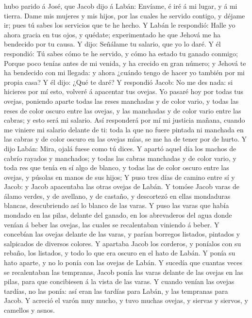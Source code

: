 hubo parido á José, que Jacob dijo á Labán: Envíame, é iré á mi lugar, y
á mi tierra.  Dame mis mujeres y mis hijos, por las
cuales he servido contigo, y déjame ir; pues tú sabes los servicios que
te he hecho.  Y Labán le respondió: Halle yo ahora gracia
en tus ojos, y quédate; experimentado he que Jehová me ha bendecido por
tu causa.  Y dijo: Señálame tu salario, que yo lo daré.
 Y él respondió: Tú sabes cómo te he servido, y cómo ha
estado tu ganado conmigo;  Porque poco tenías antes de mi
venida, y ha crecido en gran número; y Jehová te ha bendecido con mi
llegada: y ahora ¿cuándo tengo de hacer yo también por mi propia casa?
 Y él dijo: ¿Qué te daré? Y respondió Jacob: No me des
nada: si hicieres por mí esto, volveré á apacentar tus ovejas.
 Yo pasaré hoy por todas tus ovejas, poniendo aparte
todas las reses manchadas y de color vario, y todas las reses de color
oscuro entre las ovejas, y las manchadas y de color vario entre las
cabras; y esto será mi salario.  Así responderá por mí mi
justicia mañana, cuando me viniere mi salario delante de ti: toda la que
no fuere pintada ni manchada en las cabras y de color oscuro en las
ovejas mías, se me ha de tener por de hurto.  Y dijo
Labán: Mira, ojalá fuese como tú dices.  Y apartó aquel
día los machos de cabrío rayados y manchados; y todas las cabras
manchadas y de color vario, y toda res que tenía en sí algo de blanco, y
todas las de color oscuro entre las ovejas, y púsolas en manos de sus
hijos;  Y puso tres días de camino entre sí y Jacob: y
Jacob apacentaba las otras ovejas de Labán.  Y tomóse
Jacob varas de álamo verdes, y de avellano, y de castaño, y descortezó
en ellas mondaduras blancas, descubriendo así lo blanco de las varas.
 Y puso las varas que había mondado en las pilas, delante
del ganado, en los abrevaderos del agua donde venían á beber las ovejas,
las cuales se recalentaban viniendo á beber.  Y concebían
las ovejas delante de las varas, y parían borregos listados, pintados y
salpicados de diversos colores.  Y apartaba Jacob los
corderos, y poníalos con su rebaño, los listados, y todo lo que era
oscuro en el hato de Labán. Y ponía su hato aparte, y no lo ponía con
las ovejas de Labán.  Y sucedía que cuantas veces se
recalentaban las tempranas, Jacob ponía las varas delante de las ovejas
en las pilas, para que concibiesen á la vista de las varas.
 Y cuando venían las ovejas tardías, no las ponía: así
eran las tardías para Labán, y las tempranas para Jacob. 
Y acreció el varón muy mucho, y tuvo muchas ovejas, y siervas y siervos,
y camellos y asnos.

